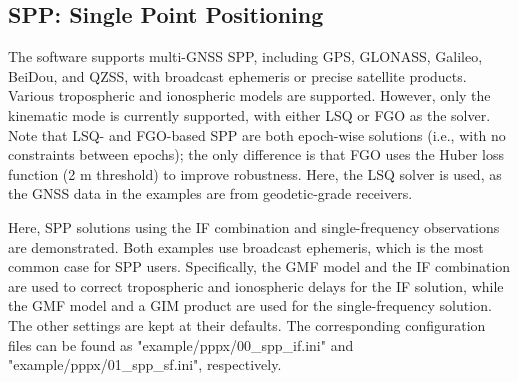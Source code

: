 \begin{table}[!hbt]
    \centering
    \caption{Products used in examples.}
    \label{tab:products_for_example}
\end{table}



\subsection{SPP: Single Point Positioning}

The \pppx{} software supports multi-GNSS SPP, including GPS, GLONASS, Galileo, BeiDou, and QZSS,
with broadcast ephemeris or precise satellite products.
Various tropospheric and ionospheric models are supported.
However, only the kinematic mode is currently supported, with either LSQ or FGO as the solver.
Note that LSQ- and FGO-based SPP are both epoch-wise solutions
(i.e., with no constraints between epochs); the only difference is that FGO uses the Huber loss
function (2 m threshold) to improve robustness.
Here, the LSQ solver is used, as the GNSS data in the examples are from geodetic-grade receivers.

Here, SPP solutions using the IF combination and single-frequency observations are demonstrated.
Both examples use broadcast ephemeris, which is the most common case for SPP users.
Specifically, the GMF model and the IF combination are used to correct tropospheric
and ionospheric delays for the IF solution, while the GMF model and a GIM product are used
for the single-frequency solution.
The other settings are kept at their defaults.
The corresponding configuration files can be found as "example/pppx/00\_spp\_if.ini"
and "example/pppx/01\_spp\_sf.ini", respectively.

